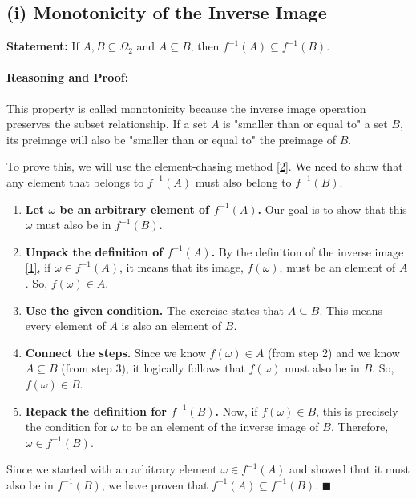 \documentclass[11pt,a4paper]{article}
\newcommand{\myref}[2]{\hyperlink{#1}{\color{red!80!black}[#2]}}
\begin{document}
\subsection*{(i) Monotonicity of the Inverse Image}

\textbf{Statement:} If $A, B \subseteq \Omega_2$ and $A \subseteq B$, then $f^{-1}(A) \subseteq f^{-1}(B)$.

\paragraph{Reasoning and Proof:}
This property is called monotonicity because the inverse image operation preserves the subset relationship. If a set $A$ is "smaller than or equal to" a set $B$, its preimage will also be "smaller than or equal to" the preimage of $B$.

To prove this, we will use the element-chasing method \myref{ref:element_chasing}{2}. We need to show that any element that belongs to $f^{-1}(A)$ must also belong to $f^{-1}(B)$.

\begin{enumerate}
    \item \textbf{Let $\omega$ be an arbitrary element of $f^{-1}(A)$.}
    Our goal is to show that this $\omega$ must also be in $f^{-1}(B)$.

    \item \textbf{Unpack the definition of $f^{-1}(A)$.}
    By the definition of the inverse image \myref{ref:inverse_image}{1}, if $\omega \in f^{-1}(A)$, it means that its image, $f(\omega)$, must be an element of $A$. So, $f(\omega) \in A$.

    \item \textbf{Use the given condition.}
    The exercise states that $A \subseteq B$. This means every element of $A$ is also an element of $B$.

    \item \textbf{Connect the steps.}
    Since we know $f(\omega) \in A$ (from step 2) and we know $A \subseteq B$ (from step 3), it logically follows that $f(\omega)$ must also be in $B$. So, $f(\omega) \in B$.

    \item \textbf{Repack the definition for $f^{-1}(B)$.}
    Now, if $f(\omega) \in B$, this is precisely the condition for $\omega$ to be an element of the inverse image of $B$. Therefore, $\omega \in f^{-1}(B)$.
\end{enumerate}
Since we started with an arbitrary element $\omega \in f^{-1}(A)$ and showed that it must also be in $f^{-1}(B)$, we have proven that $f^{-1}(A) \subseteq f^{-1}(B)$.
\hfill $\blacksquare$
\end{document}
